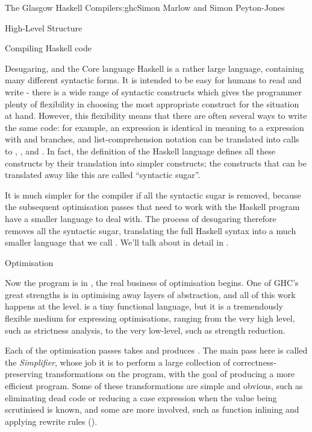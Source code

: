 \begin{aosachapter}{The Glasgow Haskell Compiler}{s:ghc}{Simon Marlow and Simon Peyton-Jones}
\begin{aosasect1}{High-Level Structure}
\begin{aosasect2}{Compiling Haskell code}
\begin{aosasect3}{Desugaring, and the Core language}
Haskell is a rather large language, containing many different
syntactic forms.  It is intended to be easy for humans to read and
write - there is a wide range of syntactic constructs which gives the
programmer plenty of flexibility in choosing the most appropriate
construct for the situation at hand.  However, this flexibility means
that there are often several ways to write the same code: for example,
an  expression is identical in meaning to a 
expression with  and  branches, and
list-comprehension notation can be translated into calls to
, , and .  In fact, the definition
of the Haskell language defines all these constructs by their
translation into simpler constructs; the constructs that can be
translated away like this are called ``syntactic sugar''.

It is much simpler for the compiler if all the syntactic sugar is
removed, because the subsequent optimisation passes that need to work
with the Haskell program have a smaller language to deal with.  The
process of desugaring therefore removes all the syntactic sugar,
translating the full Haskell syntax into a much smaller language that
we call .  We'll talk about  in detail in
.

\end{aosasect3}

\begin{aosasect3}{Optimisation}

Now the program is in , the real business of optimisation
begins.  One of GHC's great strengths is in optimising away layers of
abstraction, and all of this work happens at the  level.
 is a tiny functional language, but it is a tremendously
flexible medium for expressing optimisations, ranging from the very
high level, such as strictness analysis, to the very low-level, such
as strength reduction.

Each of the optimisation passes takes  and produces
.  The main pass here is called the \emph{Simplifier},
whose job it is to perform a large collection of
correctness-preserving transformations on the program, with the goal
of producing a more efficient program.  Some of these transformations
are simple and obvious, such as eliminating dead code or reducing a
case expression when the value being scrutinised is known, and some
are more involved, such as function inlining and applying rewrite
rules ().


\end{aosasect3}
\end{aosasect2}
\end{aosasect1}
\end{aosachapter}
